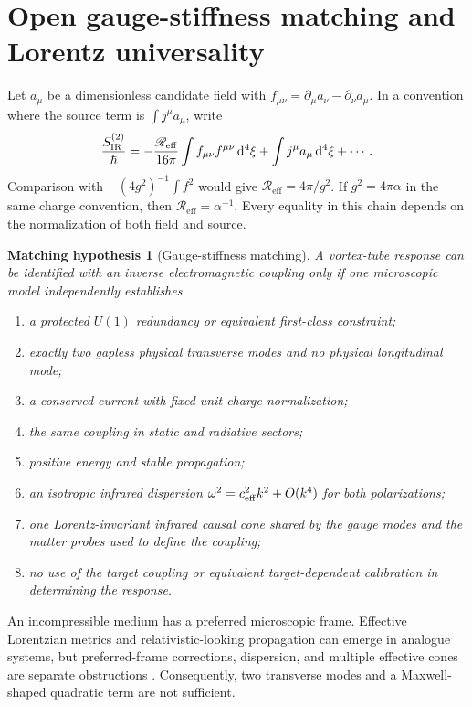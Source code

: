 \documentclass[aps,pre,preprint,notitlepage,nofootinbib,superscriptaddress]{revtex4-2}
\newcommand{\dd}{\mathrm d}
\newcommand{\Reff}{\mathscr R_{\mathrm{eff}}}
\newtheorem{hypothesis}{Matching hypothesis}
\begin{document}
\section{Open gauge-stiffness matching and Lorentz universality}
\label{sec:gauge}

Let $a_\mu$ be a dimensionless candidate field with $f_{\mu\nu}=\partial_\mu a_\nu-\partial_\nu a_\mu$.  In a convention where the source term is $\int j^\mu a_\mu$, write
\begin{equation}
  \frac{S_{\rm IR}^{(2)}}{\hbar}
  =-\frac{\Reff}{16\pi}\int f_{\mu\nu}f^{\mu\nu}\,\dd^4\xi
   +\int j^\mu a_\mu\,\dd^4\xi+\cdots.
\end{equation}
Comparison with $-(4g^2)^{-1}\int f^2$ would give $\Reff=4\pi/g^2$.  If $g^2=4\pi\alpha$ in the same charge convention, then $\Reff=\alpha^{-1}$.  Every equality in this chain depends on the normalization of both field and source.

\begin{hypothesis}[Gauge-stiffness matching]
A vortex-tube response can be identified with an inverse electromagnetic coupling only if one microscopic model independently establishes
\begin{enumerate}[label=(\alph*)]
  \item a protected $U(1)$ redundancy or equivalent first-class constraint;
  \item exactly two gapless physical transverse modes and no physical longitudinal mode;
  \item a conserved current with fixed unit-charge normalization;
  \item the same coupling in static and radiative sectors;
  \item positive energy and stable propagation;
  \item an isotropic infrared dispersion $\omega^2=c_{\rm eff}^2k^2+O(k^4)$ for both polarizations;
  \item one Lorentz-invariant infrared causal cone shared by the gauge modes and the matter probes used to define the coupling;
  \item no use of the target coupling or equivalent target-dependent calibration in determining the response.
\end{enumerate}
\end{hypothesis}

An incompressible medium has a preferred microscopic frame.  Effective Lorentzian metrics and relativistic-looking propagation can emerge in analogue systems, but preferred-frame corrections, dispersion, and multiple effective cones are separate obstructions \cite{BarceloLiberatiVisser2026}.  Consequently, two transverse modes and a Maxwell-shaped quadratic term are not sufficient.
\end{document}
